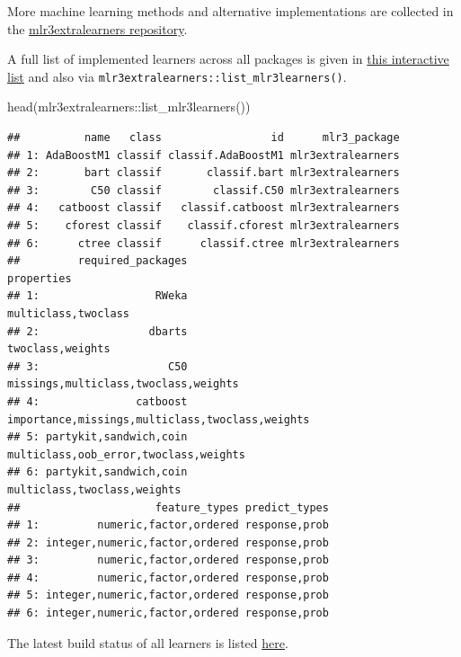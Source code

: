 \documentclass[
]{scrbook}
\makeatletter
\newenvironment{Shaded}{\begin{snugshade}}{\end{snugshade}}
\newcommand{\FunctionTok}[1]{\textcolor[rgb]{0.00,0.00,0.00}{#1}}
\newcommand{\NormalTok}[1]{#1}
\newcommand{\SpecialCharTok}[1]{\textcolor[rgb]{0.00,0.00,0.00}{#1}}
\renewenvironment{Shaded} {\begin{snugshade}\small} {\end{snugshade}}
\newenvironment{kframe}{%
\medskip{}
\setlength{\fboxsep}{.8em}
 \def\at@end@of@kframe{}%
 \ifinner\ifhmode%
  \def\at@end@of@kframe{\end{minipage}}%
  \begin{minipage}{\columnwidth}%
 \fi\fi%
 \def\FrameCommand##1{\hskip\@totalleftmargin \hskip-\fboxsep
 \colorbox{shadecolor}{##1}\hskip-\fboxsep
     \hskip-\linewidth \hskip-\@totalleftmargin \hskip\columnwidth}%
 \MakeFramed {\advance\hsize-\width
   \@totalleftmargin\z@ \linewidth\hsize
   \@setminipage}}%
 {\par\unskip\endMakeFramed%
 \at@end@of@kframe}
\newenvironment{rmdblock}[1]
  {
  \begin{itemize}
  \renewcommand{\labelitemi}{
    \raisebox{-.7\height}[0pt][0pt]{
      {\setkeys{Gin}{width=3em,keepaspectratio}\texttt{[image: images/\#1]}}
    }
  }
  \setlength{\fboxsep}{1em}
  \begin{kframe}
  \item
  }
  {
  \end{kframe}
  \end{itemize}
  }
\newenvironment{rmdnote}
  {\begin{rmdblock}{note}}
  {\end{rmdblock}}
\makeatother
\begin{document}
More machine learning methods and alternative implementations are collected in the \href{https://github.com/mlr-org/mlr3extralearners/}{mlr3extralearners repository}.

\begin{rmdnote}
A full list of implemented learners across all packages is given in
\href{https://mlr3extralearners.mlr-org.com/articles/learners/list_learners.html}{this
interactive list} and also via
\texttt{mlr3extralearners::list\_mlr3learners()}.
\end{rmdnote}

\begin{Shaded}
\begin{Highlighting}[]
\FunctionTok{head}\NormalTok{(mlr3extralearners}\SpecialCharTok{::}\FunctionTok{list\_mlr3learners}\NormalTok{())}
\end{Highlighting}
\end{Shaded}

\begin{verbatim}
##          name   class                 id      mlr3_package
## 1: AdaBoostM1 classif classif.AdaBoostM1 mlr3extralearners
## 2:       bart classif       classif.bart mlr3extralearners
## 3:        C50 classif        classif.C50 mlr3extralearners
## 4:   catboost classif   classif.catboost mlr3extralearners
## 5:    cforest classif    classif.cforest mlr3extralearners
## 6:      ctree classif      classif.ctree mlr3extralearners
##         required_packages                                      properties
## 1:                  RWeka                             multiclass,twoclass
## 2:                 dbarts                                twoclass,weights
## 3:                    C50            missings,multiclass,twoclass,weights
## 4:               catboost importance,missings,multiclass,twoclass,weights
## 5: partykit,sandwich,coin           multiclass,oob_error,twoclass,weights
## 6: partykit,sandwich,coin                     multiclass,twoclass,weights
##                     feature_types predict_types
## 1:         numeric,factor,ordered response,prob
## 2: integer,numeric,factor,ordered response,prob
## 3:         numeric,factor,ordered response,prob
## 4:         numeric,factor,ordered response,prob
## 5: integer,numeric,factor,ordered response,prob
## 6: integer,numeric,factor,ordered response,prob
\end{verbatim}

The latest build status of all learners is listed \href{https://mlr3extralearners.mlr-org.com/articles/learners/learner_status.html}{here}.
\end{document}
